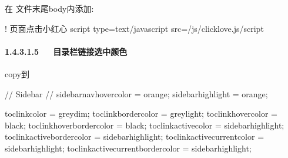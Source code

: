 \documentclass[letterpaper,12pt,english]{sphinxmanual}
\begin{document}
在  文件末尾body内添加:

\begin{sphinxVerbatim}[commandchars=\\\{\}]
\PYGZlt{}!\PYGZhy{}\PYGZhy{} 页面点击小红心 \PYGZhy{}\PYGZhy{}\PYGZgt{}
\PYGZlt{}script type=\PYGZdq{}text/javascript\PYGZdq{} src=\PYGZdq{}/js/clicklove.js\PYGZdq{}\PYGZgt{}\PYGZlt{}/script\PYGZgt{}
\end{sphinxVerbatim}


\paragraph{1.4.3.1.5   目录栏链接选中颜色}
\label{\detokenize{001software/001install/001._u7f51_u7ad9/hexo:id5}}
copy到

\begin{sphinxVerbatim}[commandchars=\\\{\}]
// Sidebar
// \PYGZhy{}\PYGZhy{}\PYGZhy{}\PYGZhy{}\PYGZhy{}\PYGZhy{}\PYGZhy{}\PYGZhy{}\PYGZhy{}\PYGZhy{}\PYGZhy{}\PYGZhy{}\PYGZhy{}\PYGZhy{}\PYGZhy{}\PYGZhy{}\PYGZhy{}\PYGZhy{}\PYGZhy{}\PYGZhy{}\PYGZhy{}\PYGZhy{}\PYGZhy{}\PYGZhy{}\PYGZhy{}\PYGZhy{}\PYGZhy{}\PYGZhy{}\PYGZhy{}\PYGZhy{}\PYGZhy{}\PYGZhy{}\PYGZhy{}\PYGZhy{}\PYGZhy{}\PYGZhy{}\PYGZhy{}\PYGZhy{}\PYGZhy{}\PYGZhy{}\PYGZhy{}\PYGZhy{}\PYGZhy{}\PYGZhy{}\PYGZhy{}\PYGZhy{}\PYGZhy{}\PYGZhy{}\PYGZhy{}\PYGZhy{}
\PYGZdl{}sidebar\PYGZhy{}nav\PYGZhy{}hover\PYGZhy{}color          = \PYGZdl{}orange;
\PYGZdl{}sidebar\PYGZhy{}highlight                = \PYGZdl{}orange;

\PYGZdl{}toc\PYGZhy{}link\PYGZhy{}color                       = \PYGZdl{}grey\PYGZhy{}dim;
\PYGZdl{}toc\PYGZhy{}link\PYGZhy{}border\PYGZhy{}color                = \PYGZdl{}grey\PYGZhy{}light;
\PYGZdl{}toc\PYGZhy{}link\PYGZhy{}hover\PYGZhy{}color                 = black;
\PYGZdl{}toc\PYGZhy{}link\PYGZhy{}hover\PYGZhy{}border\PYGZhy{}color          = black;
\PYGZdl{}toc\PYGZhy{}link\PYGZhy{}active\PYGZhy{}color                = \PYGZdl{}sidebar\PYGZhy{}highlight;
\PYGZdl{}toc\PYGZhy{}link\PYGZhy{}active\PYGZhy{}border\PYGZhy{}color         = \PYGZdl{}sidebar\PYGZhy{}highlight;
\PYGZdl{}toc\PYGZhy{}link\PYGZhy{}active\PYGZhy{}current\PYGZhy{}color        = \PYGZdl{}sidebar\PYGZhy{}highlight;
\PYGZdl{}toc\PYGZhy{}link\PYGZhy{}active\PYGZhy{}current\PYGZhy{}border\PYGZhy{}color = \PYGZdl{}sidebar\PYGZhy{}highlight;
\end{sphinxVerbatim}
\end{document}
